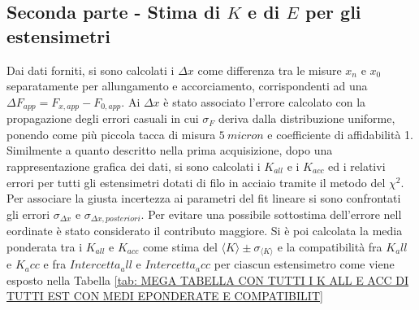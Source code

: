 \documentclass[a4paper,11pt,oneside]{article}
\begin{document}

\subsection{Seconda parte - Stima di $K$ e di $E$ per gli estensimetri}
Dai dati forniti, si sono calcolati i $\Delta x$ come differenza tra le misure $x_n$ e $x_0$ separatamente per allungamento e accorciamento, corrispondenti ad una $\Delta F_{app} = F_{x, app} - F_{0, app}$. Ai $\Delta x$ è stato associato l'errore calcolato con la propagazione degli errori casuali in cui $\sigma_{F}$ deriva dalla distribuzione uniforme, ponendo come più piccola tacca di misura $\SI{5}{micron}$ e coefficiente di affidabilità 1.
Similmente a quanto descritto nella prima acquisizione, dopo una rappresentazione grafica dei dati, si sono calcolati i $K_{all}$ e i $K_{acc}$ ed i relativi errori per tutti gli estensimetri dotati di filo in acciaio tramite il metodo del $\chi^2$. Per associare la giusta incertezza ai parametri del fit lineare si sono confrontati gli errori $\sigma_{\Delta x}$ e $\sigma_{\Delta x, posteriori}$. Per evitare una possibile sottostima dell'errore nell eordinate è stato considerato il contributo maggiore. Si è poi calcolata la media ponderata tra i $K_{all}$ e $K_{acc}$ come stima del ${\langle K\rangle }\pm \sigma_{{\langle K\rangle }}$ e la compatibilità fra $K_all$ e $K_acc$ e fra $Intercetta_all$ e $Intercetta_acc$ per ciascun estensimetro come viene esposto nella Tabella \ref{tab: MEGA TABELLA CON TUTTI I K ALL E ACC DI TUTTI EST CON MEDI EPONDERATE E COMPATIBILIT}

\begin{figure}[H]
    \centering
    \newline
    \newline
    \newline
    
\end{figure}
\begin{figure}[h!]
    \centering
\end{figure}
\end{document}

